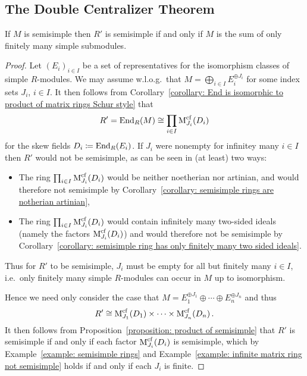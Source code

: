 \subsection{The Double Centralizer Theorem}


\begin{proposition}
  \label{proposition: when R' is semisimple}
  If $M$ is semisimple then $R'$ is semisimple if and only if $M$ is the sum of only finitely many simple submodules.
\end{proposition}


\begin{proof}
  Let $(E_i)_{i \in I}$ be a set of representatives for the isomorphism classes of simple $R$-modules.
  We may assume w.l.o.g.\ that $M = \bigoplus_{i \in I} E_i^{\oplus J_i}$ for some index sets $J_i$, $i \in I$.
  It then follows from Corollary~\ref{corollary: End is isomorphic to product of matrix rings Schur style} that
  \[
          R'
    =     \operatorname{End}_R(M)
    \cong \prod_{i \in I} \operatorname{M}_{J_i}^{{\operatorname{cf}}}(D_i)
  \]
  for the skew fields $D_i \coloneqq \operatorname{End}_R(E_i)$.
  If $J_i$ were nonempty for infinitey many $i \in I$ then $R'$ would not be semisimple, as can be seen in (at least) two ways:
  \begin{itemize}
    \item
      The ring $\prod_{i \in I} \operatorname{M}_{J_i}^{{\operatorname{cf}}}(D_i)$ would be neither noetherian nor artinian, and would therefore not semisimple by Corollary~\ref{corollary: semisimple rings are notherian artinian},
    \item
      The ring $\prod_{i \in I} \operatorname{M}_{J_i}^{{\operatorname{cf}}}(D_i)$ would contain infinitely many two-sided ideals (namely the factors $\operatorname{M}_{J_i}^{{\operatorname{cf}}}(D_i)$) and would therefore not be semisimple by Corollary~\ref{corollary: semisimple ring has only finitely many two sided ideals}.
  \end{itemize}
  Thus for $R'$ to be semisimple, $J_i$ must be empty for all but finitely many $i \in I$, i.e.\ only finitely many simple $R$-modules can occur in $M$ up to isomorphism.
  
  Hence we need only consider the case that $M = E_1^{\oplus J_1} \oplus \dotsb \oplus E_n^{\oplus J_n}$ and thus
  \[
          R'
    \cong \operatorname{M}_{J_1}^{{\operatorname{cf}}}(D_1) \times \dotsb \times \operatorname{M}_{J_n}^{{\operatorname{cf}}}(D_n) \,.
  \]
  It then follows from Proposition~\ref{proposition: product of semisimple} that $R'$ is semisimple if and only if each factor $\operatorname{M}_{J_i}^{{\operatorname{cf}}}(D_i)$ is semisimple, which by Example~\ref{example: semisimple rings} and Example~\ref{example: infinite matrix ring not semisimple} holds if and only if each $J_i$ is finite.
\end{proof}



